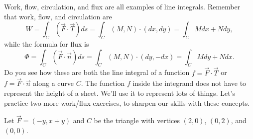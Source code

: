 Work, flow, circulation, and flux are all examples of line integrals.  Remember that work, flow, and circulation are 
$$W=\int_C (\vec F\cdot \vec T)ds =\int_C (M,N)\cdot(dx,dy) =  \int_C Mdx+Ndy,$$
while the formula for flux is
$$\Phi=\int_C (\vec F\cdot \vec n)ds =\int_C (M,N)\cdot(dy,-dx) =  \int_C Mdy+Ndx.$$
Do you see how these are both the line integral of a function $f = \vec F\cdot \vec T$ or $f=\vec F\cdot \vec n$ along a curve $C$.  The function $f$ inside the integrand does not have to represent the height of a sheet. We'll use it to represent lots of things.  Let's practice two more work/flux exercises, to sharpen our skills with these concepts. 

%

\begin{problem}
%
%
Let $\vec F=(-y,x+y)$ and $C$ be the triangle with vertices $(2,0)$, $(0,2)$, and $(0,0)$.
\begin{enumerate}

\end{enumerate}
\end{problem}
